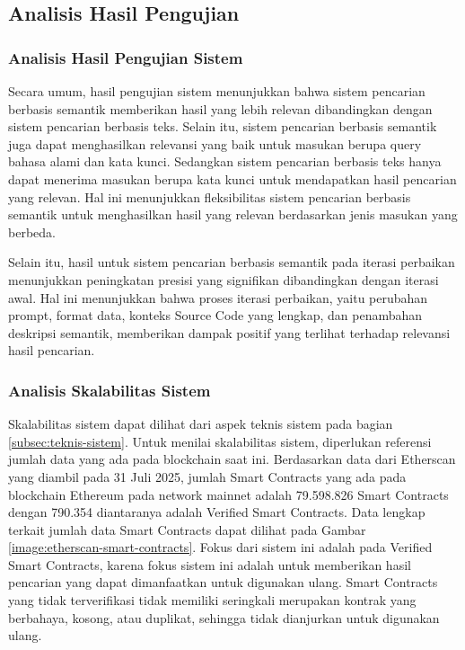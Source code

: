 \subsection{Analisis Hasil Pengujian}

\subsubsection{Analisis Hasil Pengujian Sistem}

Secara umum, hasil pengujian sistem menunjukkan bahwa sistem pencarian berbasis semantik memberikan hasil yang lebih relevan dibandingkan dengan sistem pencarian berbasis teks. Selain itu, sistem pencarian berbasis semantik juga dapat menghasilkan relevansi yang baik untuk masukan berupa query bahasa alami dan kata kunci. Sedangkan sistem pencarian berbasis teks hanya dapat menerima masukan berupa kata kunci untuk mendapatkan hasil pencarian yang relevan. Hal ini menunjukkan fleksibilitas sistem pencarian berbasis semantik untuk menghasilkan hasil yang relevan berdasarkan jenis masukan yang berbeda.

Selain itu, hasil untuk sistem pencarian berbasis semantik pada iterasi perbaikan menunjukkan peningkatan presisi yang signifikan dibandingkan dengan iterasi awal. Hal ini menunjukkan bahwa proses iterasi perbaikan, yaitu perubahan prompt, format data, konteks Source Code yang lengkap, dan penambahan deskripsi semantik, memberikan dampak positif yang terlihat terhadap relevansi hasil pencarian.

\subsubsection{Analisis Skalabilitas Sistem}

Skalabilitas sistem dapat dilihat dari aspek teknis sistem pada bagian \ref{subsec:teknis-sistem}. Untuk menilai skalabilitas sistem, diperlukan referensi jumlah data yang ada pada blockchain saat ini. Berdasarkan data dari Etherscan yang diambil pada 31 Juli 2025, jumlah Smart Contracts yang ada pada blockchain Ethereum pada network mainnet adalah 79.598.826 Smart Contracts dengan 790.354 diantaranya adalah Verified Smart Contracts. Data lengkap terkait jumlah data Smart Contracts dapat dilihat pada Gambar \ref{image:etherscan-smart-contracts}. Fokus dari sistem ini adalah pada Verified Smart Contracts, karena fokus sistem ini adalah untuk memberikan hasil pencarian yang dapat dimanfaatkan untuk digunakan ulang. Smart Contracts yang tidak terverifikasi tidak memiliki seringkali merupakan kontrak yang berbahaya, kosong, atau duplikat, sehingga tidak dianjurkan untuk digunakan ulang.

